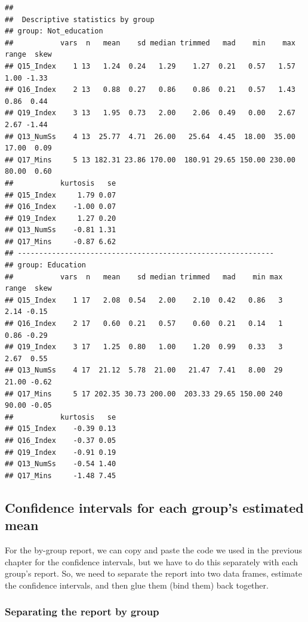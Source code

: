 \documentclass[
]{article}
\begin{document}
\begin{verbatim}
## 
##  Descriptive statistics by group 
## group: Not_education
##           vars  n   mean    sd median trimmed   mad    min    max range  skew
## Q15_Index    1 13   1.24  0.24   1.29    1.27  0.21   0.57   1.57  1.00 -1.33
## Q16_Index    2 13   0.88  0.27   0.86    0.86  0.21   0.57   1.43  0.86  0.44
## Q19_Index    3 13   1.95  0.73   2.00    2.06  0.49   0.00   2.67  2.67 -1.44
## Q13_NumSs    4 13  25.77  4.71  26.00   25.64  4.45  18.00  35.00 17.00  0.09
## Q17_Mins     5 13 182.31 23.86 170.00  180.91 29.65 150.00 230.00 80.00  0.60
##           kurtosis   se
## Q15_Index     1.79 0.07
## Q16_Index    -1.00 0.07
## Q19_Index     1.27 0.20
## Q13_NumSs    -0.81 1.31
## Q17_Mins     -0.87 6.62
## ------------------------------------------------------------ 
## group: Education
##           vars  n   mean    sd median trimmed   mad    min max range  skew
## Q15_Index    1 17   2.08  0.54   2.00    2.10  0.42   0.86   3  2.14 -0.15
## Q16_Index    2 17   0.60  0.21   0.57    0.60  0.21   0.14   1  0.86 -0.29
## Q19_Index    3 17   1.25  0.80   1.00    1.20  0.99   0.33   3  2.67  0.55
## Q13_NumSs    4 17  21.12  5.78  21.00   21.47  7.41   8.00  29 21.00 -0.62
## Q17_Mins     5 17 202.35 30.73 200.00  203.33 29.65 150.00 240 90.00 -0.05
##           kurtosis   se
## Q15_Index    -0.39 0.13
## Q16_Index    -0.37 0.05
## Q19_Index    -0.91 0.19
## Q13_NumSs    -0.54 1.40
## Q17_Mins     -1.48 7.45
\end{verbatim}

\hypertarget{confidence-intervals-for-each-groups-estimated-mean}{%
\subsection{Confidence intervals for each group's estimated mean}\label{confidence-intervals-for-each-groups-estimated-mean}}

For the by-group report, we can copy and paste the code we used in the previous chapter for the confidence intervals, but we have to do this separately with each group's report. So, we need to separate the report into two data frames, estimate the confidence intervals, and then glue them (bind them) back together.

\hypertarget{separating-the-report-by-group}{%
\subsubsection{Separating the report by group}\label{separating-the-report-by-group}}
\end{document}
